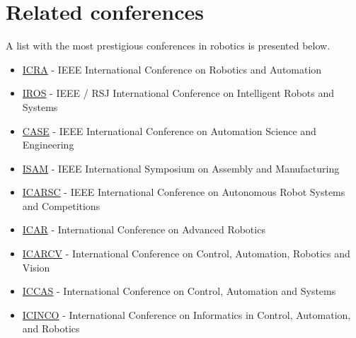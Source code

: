 


\section{Related conferences}

A list with the most prestigious conferences in robotics is presented below.

\begin{itemize}[leftmargin=2em]
	\item \href{http://www.ieee-ras.org/conferences-workshops/fully-sponsored/icra}{ICRA} - IEEE International Conference on Robotics and Automation
	\item \href{http://www.ieee-ras.org/conferences-workshops/financially-co-sponsored/iros}{IROS} - IEEE / RSJ International Conference on Intelligent Robots and Systems
	\item \href{http://www.ieee-ras.org/conferences-workshops/fully-sponsored/case}{CASE} - IEEE International Conference on Automation Science and Engineering
	\item \href{http://www.ieee-ras.org/conferences-workshops/fully-sponsored/isam}{ISAM} - IEEE International Symposium on Assembly and Manufacturing
	\item \href{http://www.ieee-ras.org/conferences-workshops/technically-co-sponsored/robotica}{ICARSC} - IEEE International Conference on Autonomous Robot Systems and Competitions
	\item \href{http://www.ieee-ras.org/conferences-workshops/technically-co-sponsored/icar}{ICAR} - International Conference on Advanced Robotics
	\item \href{http://www.ieee-ras.org/conferences-workshops/technically-co-sponsored/icarcv}{ICARCV} - International Conference on Control, Automation, Robotics and Vision 
	\item \href{http://www.ieee-ras.org/conferences-workshops/technically-co-sponsored/iccas}{ICCAS} - International Conference on Control, Automation and Systems
	\item \href{http://www.ieee-ras.org/conferences-workshops/technically-co-sponsored/icinco}{ICINCO} - International Conference on Informatics in Control, Automation, and Robotics
\end{itemize}



